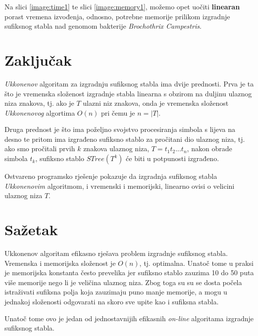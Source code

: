 \documentclass[times, utf8, seminar, numeric]{fer}
\begin{document}
Na slici \ref{image:time1} te slici \ref{image:memory1}, možemo opet uočiti \textbf{linearan} porast vremena izvođenja, odnosno, potrebne memorije prilikom izgradnje sufiksnog stabla nad genomom bakterije \textit{Brochothrix Campestris}.

\chapter{Zaključak}
	\textit{Ukkonenov} algoritam za izgradnju sufiksnog stabla ima dvije prednosti. Prva je ta što je vremenska složenost izgradnje stabla linearna s obzirom na duljinu ulaznog niza znakova, tj. ako je $T$ ulazni niz znakova, onda je vremenska složenost \textit{Ukkonenovog} algortima $O(n)$ pri čemu je $n = |T|$.
	
	Druga prednost je što ima poželjno svojstvo procesiranja simbola s lijeva na desno te pritom ima izgrađeno sufiksno stablo za pročitani dio ulaznog niza, tj. ako smo pročitali prvih $k$ znakova ulaznog niza, $T = t_1 t_2 ... t_n$, nakon obrade simbola $t_k$, sufiksno stablo $STree(T^k)$ će biti u potpunosti izgrađeno.

 	Ostvareno programsko rješenje pokazuje da izgradnja sufiksnog stabla \textit{Ukkonenovim} algoritmom, i vremenski i memorijski, linearno ovisi o velicini ulaznog niza $T$.




\chapter{Sažetak}
Ukkonenov algoritam efikasno rješava problem izgradnje sufiksnog stabla. Vremenska i memorijska složenost je $O(n)$, tj. optimalna. Unatoč tome u praksi je memorijska konstanta često prevelika jer sufiksno stablo zauzima 10 do 50 puta više memorije nego li je veličina ulaznog niza. Zbog toga su su se dosta počela istraživati sufiksna polja koja zauzimaju puno manje memorije, a mogu u jednakoj složenosti odgovarati na skoro sve upite kao i sufiksna stabla.

Unatoč tome ovo je jedan od jednostavnijih efikasnih \textit{on-line} algoritama izgradnje sufiksnog stabla.
\end{document}
